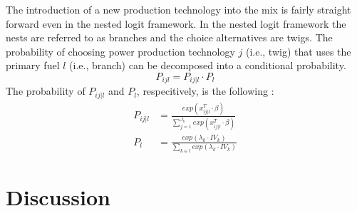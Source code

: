 \documentclass[10pt]{amsart}
\begin{document}
The introduction of a new production technology into the mix is fairly straight forward even in the nested logit framework. 
In the nested logit framework the nests are referred to as branches and the choice alternatives are twigs.
The probability of choosing power production technology $j$ (i.e., twig) that uses the primary fuel $l$ (i.e., branch) can be decomposed into a conditional probability.
\begin{equation}
P_{ijl} = P_{ij \vert l} \cdot P_{l}
\end{equation} 
The probability of $P_{ij \vert l}$ and $P_{l}$, respecitively, is the following \parencite{greene2012}:
\begin{equation}
\begin{split}
P_{ij \vert l} &= \frac{exp(x^T_{ij \vert l}\cdot \beta)}{\sum_{j=1}^{J_b} exp(x^{T}_{ij \vert l}\cdot \beta)} \\
P_{l} &= \frac{exp(\lambda_k \cdot IV_{k})}{\sum_{k \in l} exp(\lambda_k \cdot IV_k)}
\end{split}
\end{equation}


\section{Discussion}



\newpage
{}
\begin{landscape}
\end{landscape}
\restoregeometry



\newpage
\printbibliography
\end{document}
